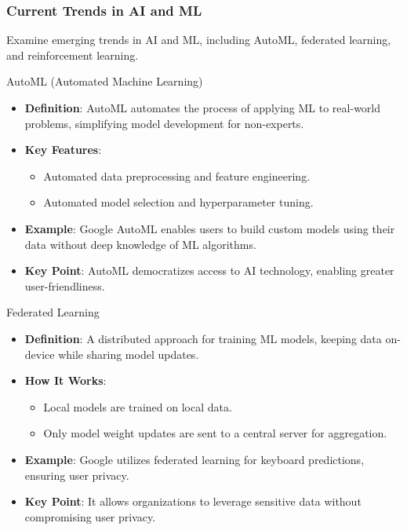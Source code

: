 \documentclass[aspectratio=169]{beamer}
\begin{document}
\begin{frame}
    \frametitle{Current Trends in AI and ML}
    Examine emerging trends in AI and ML, including AutoML, federated learning, and reinforcement learning.
\end{frame}

\begin{frame}{AutoML (Automated Machine Learning)}
    \begin{itemize}
        \item \textbf{Definition}: AutoML automates the process of applying ML to real-world problems, simplifying model development for non-experts.
        \item \textbf{Key Features}:
        \begin{itemize}
            \item Automated data preprocessing and feature engineering.
            \item Automated model selection and hyperparameter tuning.
        \end{itemize}
        \item \textbf{Example}: Google AutoML enables users to build custom models using their data without deep knowledge of ML algorithms.
        \item \textbf{Key Point}: AutoML democratizes access to AI technology, enabling greater user-friendliness.
    \end{itemize}
\end{frame}

\begin{frame}{Federated Learning}
    \begin{itemize}
        \item \textbf{Definition}: A distributed approach for training ML models, keeping data on-device while sharing model updates.
        \item \textbf{How It Works}:
        \begin{itemize}
            \item Local models are trained on local data.
            \item Only model weight updates are sent to a central server for aggregation.
        \end{itemize}
        \item \textbf{Example}: Google utilizes federated learning for keyboard predictions, ensuring user privacy.
        \item \textbf{Key Point}: It allows organizations to leverage sensitive data without compromising user privacy.
    \end{itemize}
\end{frame}
\end{document}
